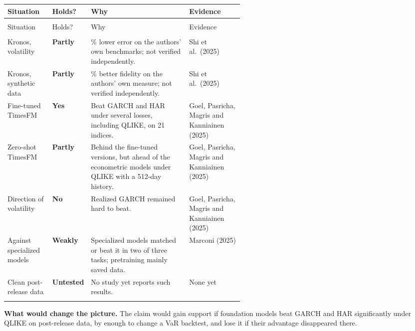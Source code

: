 {\small
\begin{longtable}{@{}>{\raggedright\arraybackslash}p{0.19\linewidth}>{\raggedright\arraybackslash}p{0.13\linewidth}>{\raggedright\arraybackslash}p{}>{\raggedright\arraybackslash}p{0.23\linewidth}@{}}
\toprule
Situation & Holds? & Why & Evidence \\
\midrule
\endfirsthead
\multicolumn{4}{@{}l}{\emph{(continued)}} \\
\toprule
Situation & Holds? & Why & Evidence \\
\midrule
\endhead
\midrule
\multicolumn{4}{r@{}}{\emph{(continued on the next page)}} \\
\endfoot
\bottomrule
\endlastfoot
Kronos, volatility & \textbf{Partly} & 9\% lower error on the authors' own benchmarks; not verified independently. & Shi et al.\ (2025) \\*
\addlinespace[3pt]
Kronos, synthetic data & \textbf{Partly} & 22\% better fidelity on the authors' own measure; not verified independently. & Shi et al.\ (2025) \\*
\addlinespace[3pt]
Fine-tuned TimesFM & \textbf{Yes} & Beat GARCH and HAR under several losses, including QLIKE, on 21 indices. & Goel, Pasricha, Magris and Kanniainen (2025) \\*
\addlinespace[3pt]
Zero-shot TimesFM & \textbf{Partly} & Behind the fine-tuned versions, but ahead of the econometric models under QLIKE with a 512-day history. & Goel, Pasricha, Magris and Kanniainen (2025) \\*
\addlinespace[3pt]
Direction of volatility & \textbf{No} & Realized GARCH remained hard to beat. & Goel, Pasricha, Magris and Kanniainen (2025) \\*
\addlinespace[3pt]
Against specialized models & \textbf{Weakly} & Specialized models matched or beat it in two of three tasks; pretraining mainly saved data. & Marconi (2025) \\*
\addlinespace[3pt]
Clean post-release data & \textbf{Untested} & No study yet reports such results. & None yet \\*
\end{longtable}
\addtocounter{table}{-1}%
}

\textbf{What would change the picture.} The claim would gain support if foundation models beat GARCH and HAR significantly under QLIKE on post-release data, by enough to change a VaR backtest, and lose it if their advantage disappeared there.

